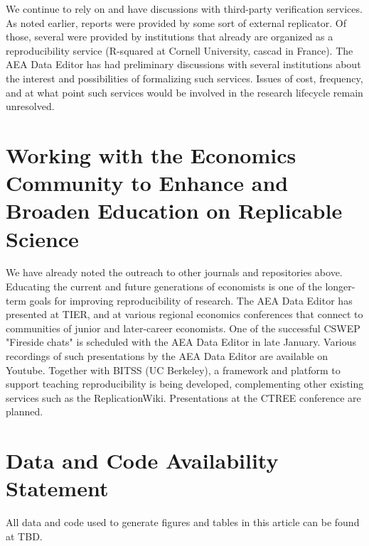 \documentclass[PP]{AEA}
\begin{document}
We continue to rely on and have discussions with third-party verification services. As noted earlier, \jiramcsexternal{} reports were provided by some sort of external replicator. Of those, several were provided by institutions that already are organized as a reproducibility service (R-squared at Cornell University, cascad in France). The AEA Data Editor has had preliminary discussions with several institutions about the interest and possibilities of formalizing such services. Issues of cost, frequency, and at what point such services would be involved in the research lifecycle remain unresolved. 



\section{Working with the Economics Community to Enhance and Broaden Education on Replicable Science}

We have already noted the outreach to other journals and repositories above. Educating the current and future generations of economists is one of the longer-term goals for improving reproducibility of research. The AEA Data Editor has presented at TIER, and at various regional economics conferences that connect to communities of junior and later-career economists. One of the successful CSWEP "Fireside chats" is scheduled with the AEA Data Editor in late January. Various recordings of such presentations by the AEA Data Editor are available on Youtube. Together with BITSS (UC Berkeley), a framework and platform to support teaching reproducibility is being developed, complementing other existing services such as the ReplicationWiki. Presentations at the CTREE conference are planned. 

\section{Data and Code Availability Statement}
\label{sec:dcas}

All data and code used to generate figures and tables in this article can be found at TBD.

\FloatBarrier
%
%



\appendix

%
\end{document}
